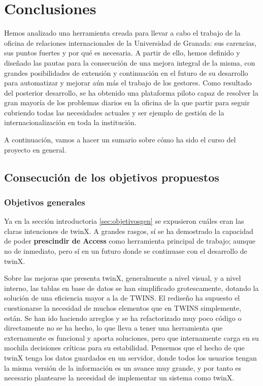 \chapter{Conclusiones}

Hemos analizado una herramienta creada para llevar a cabo el trabajo de la oficina de relaciones internacionales de la Universidad de Granada: sus carencias, sus puntos fuertes y por qué es necesaria. A partir de ello, hemos definido y diseñado las pautas para la consecución de una mejora integral de la misma, con grandes posibilidades de extensión y continuación en el futuro de su desarrollo para automatizar y mejorar aún más el trabajo de los gestores. Como resultado del posterior desarrollo, se ha obtenido una plataforma piloto capaz de resolver la gran mayoría de los problemas diarios en la oficina de la que partir para seguir cubriendo todas las necesidades actuales y ser ejemplo de gestión de la internacionalización en toda la institución.

A continuación, vamos a hacer un sumario sobre cómo ha sido el curso del proyecto en general.

\section{Consecución de los objetivos propuestos}

\subsection{Objetivos generales}

Ya en la sección introductoria \ref{sec:objetivosgen} se expusieron cuáles eran las claras intenciones de twinX. A grandes rasgos, sí se ha demostrado la capacidad de poder \textbf{prescindir de Access\textregistered} como herramienta principal de trabajo; aunque no de inmediato, pero sí en un futuro donde se continuase con el desarrollo de twinX.

Sobre las mejoras que presenta twinX, generalmente a nivel visual, y a nivel interno, las tablas en base de datos se han simplificado grotescamente, dotando la solución de una eficiencia mayor a la de TWINS. El rediseño ha supuesto el cuestionarse la necesidad de muchos elementos que en TWINS simplemente, están. Se han ido haciendo arreglos y se ha refactorizado muy poco código o directamente no se ha hecho, lo que lleva a tener una herramienta que externamente es funcional y aporta soluciones, pero que internamente carga en su mochila decisiones críticas para su estabilidad. Pensemos que el hecho de que twinX tenga los datos guardados en un servidor, donde todos los usuarios tengan la misma versión de la información es un avance muy grande, y por tanto es necesario plantearse la necesidad de implementar un sistema como twinX.

